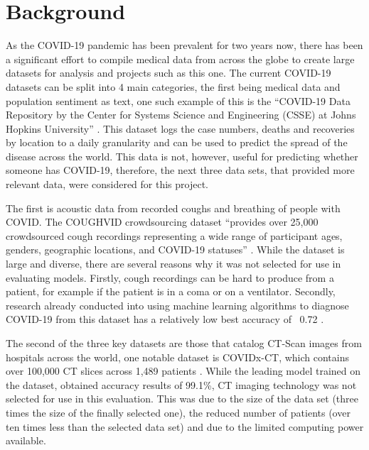 \section{Background}
As the COVID-19 pandemic has been prevalent for two years now, there has been a significant effort to compile medical data from across the globe to create large datasets for analysis and projects such as this one. The current COVID-19 datasets can be split into 4 main categories, the first being medical data and population sentiment as text, one such example of this is the “COVID-19 Data Repository by the Center for Systems Science and Engineering (CSSE) at Johns Hopkins University” \citep{dong2020interactive}. This dataset logs the case numbers, deaths and recoveries by location to a daily granularity and can be used to predict the spread of the disease across the world. This data is not, however, useful for predicting whether someone has COVID-19, therefore, the next three data sets, that provided more relevant data, were considered for this project.

The first is acoustic data from recorded coughs and breathing of people with COVID. The COUGHVID crowdsourcing dataset “provides over 25,000 crowdsourced cough recordings representing a wide range of participant ages, genders, geographic locations, and COVID-19 statuses” \citep[pg. 1]{orlandic2021coughvid}. While the dataset is large and diverse, there are several reasons why it was not selected for use in evaluating models. Firstly, cough recordings can be hard to produce from a patient, for example if the patient is in a coma or on a ventilator. Secondly, research already conducted into using machine learning algorithms to diagnose COVID-19 from this dataset has a relatively low best accuracy of ~0.72 \citep{chang2021covnet}. 

The second of the three key datasets are those that catalog CT-Scan images from hospitals across the world, one notable dataset is COVIDx-CT, which contains over 100,000 CT slices across 1,489 patients \citep{gunraj2020covidnet}. While the leading model trained on the dataset, obtained accuracy results of 99.1\%, CT imaging technology was not selected for use in this evaluation. This was due to the size of the data set (three times the size of the finally selected one), the reduced number of patients (over ten times less than the selected data set) and due to the limited computing power available.

